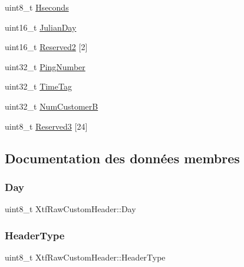 \begin{DoxyCompactItemize}
\item 
uint8\+\_\+t \hyperlink{structXtfRawCustomHeader_aaec16fb862b1957be53665761583ef66}{Hseconds}
\item 
uint16\+\_\+t \hyperlink{structXtfRawCustomHeader_a4611ef0fd925f59a120fa3e721d0d757}{Julian\+Day}
\item 
uint16\+\_\+t \hyperlink{structXtfRawCustomHeader_a5da6426b345e754a28059c8527f00173}{Reserved2} \mbox{[}2\mbox{]}
\item 
uint32\+\_\+t \hyperlink{structXtfRawCustomHeader_a13a9dfda0cd8ada5ec3bc33d18e2abf3}{Ping\+Number}
\item 
uint32\+\_\+t \hyperlink{structXtfRawCustomHeader_a62c123a084f16646b3d00d9397070a53}{Time\+Tag}
\item 
uint32\+\_\+t \hyperlink{structXtfRawCustomHeader_aa06c9c4a8d1331176ed6158a189ca9a9}{Num\+CustomerB}
\item 
uint8\+\_\+t \hyperlink{structXtfRawCustomHeader_a35161c2f84d49cb6dfe1934dcea22e6e}{Reserved3} \mbox{[}24\mbox{]}
\end{DoxyCompactItemize}


\subsection{Documentation des données membres}
\mbox{\label{structXtfRawCustomHeader_a720d7963dfa30cde7f12478e42009dbf}} 
\subsubsection{\texorpdfstring{Day}{Day}}
{\footnotesize\ttfamily uint8\+\_\+t Xtf\+Raw\+Custom\+Header\+::\+Day}

\mbox{\label{structXtfRawCustomHeader_a39a8c5a2cf24296ed2a12bace730b41f}} 
\subsubsection{\texorpdfstring{Header\+Type}{HeaderType}}
{\footnotesize\ttfamily uint8\+\_\+t Xtf\+Raw\+Custom\+Header\+::\+Header\+Type}

